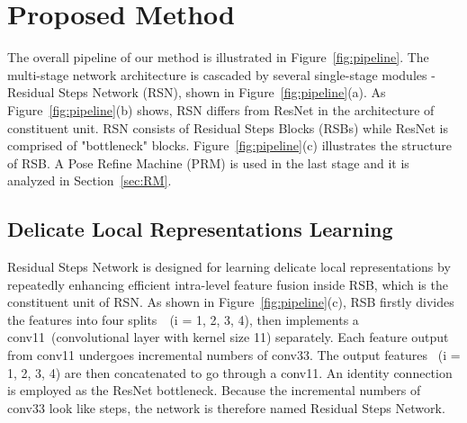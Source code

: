 \documentclass[runningheads]{llncs}
\begin{document}
\section{Proposed Method}
The overall pipeline of our method is illustrated in Figure~\ref{fig:pipeline}. The multi-stage network architecture is cascaded by several single-stage modules - Residual Steps Network (RSN), shown in Figure~\ref{fig:pipeline}(a). As Figure~\ref{fig:pipeline}(b) shows, RSN differs from ResNet in the architecture of constituent unit. RSN consists of Residual Steps Blocks (RSBs) while ResNet is comprised of "bottleneck" blocks. Figure~\ref{fig:pipeline}(c) illustrates the structure of RSB. A Pose Refine Machine (PRM) is used in the last stage and it is analyzed in Section~\ref{sec:RM}. 













\subsection{Delicate Local Representations Learning}
Residual Steps Network is designed for learning delicate local representations by repeatedly enhancing efficient intra-level feature fusion inside RSB, which is the constituent unit of RSN.
As shown in Figure~\ref{fig:pipeline}(c), RSB firstly divides the features into four splits~~(i = 1, 2, 3, 4), then implements a conv11~(convolutional layer with kernel size 11) separately. Each feature output from conv11 undergoes incremental numbers of conv33. The output features~ (i = 1, 2, 3, 4) are then concatenated to go through a conv11. An identity connection is employed as the ResNet bottleneck. Because the incremental numbers of conv33 look like steps, the network is therefore named Residual Steps Network.
\end{document}
